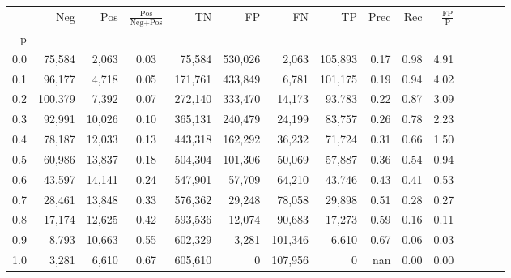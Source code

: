 \begin{tabular}{rrrcrrrrrrrrrrr}
\toprule
{} &      Neg &     Pos & $\frac{\text{Pos}}{\text{Neg}+\text{Pos}}$ &       TN &       FP &       FN &       TP &  Prec &   Rec & $\frac{\text{FP}}{\text{P}}$ \\
p   &          &         &                                            &          &          &          &          &       &       &                              \\
\midrule
0.0 &   75,584 &   2,063 &                                       0.03 &   75,584 &  530,026 &    2,063 &  105,893 &  0.17 &  0.98 &                         4.91 \\
0.1 &   96,177 &   4,718 &                                       0.05 &  171,761 &  433,849 &    6,781 &  101,175 &  0.19 &  0.94 &                         4.02 \\
0.2 &  100,379 &   7,392 &                                       0.07 &  272,140 &  333,470 &   14,173 &   93,783 &  0.22 &  0.87 &                         3.09 \\
0.3 &   92,991 &  10,026 &                                       0.10 &  365,131 &  240,479 &   24,199 &   83,757 &  0.26 &  0.78 &                         2.23 \\
0.4 &   78,187 &  12,033 &                                       0.13 &  443,318 &  162,292 &   36,232 &   71,724 &  0.31 &  0.66 &                         1.50 \\
0.5 &   60,986 &  13,837 &                                       0.18 &  504,304 &  101,306 &   50,069 &   57,887 &  0.36 &  0.54 &                         0.94 \\
0.6 &   43,597 &  14,141 &                                       0.24 &  547,901 &   57,709 &   64,210 &   43,746 &  0.43 &  0.41 &                         0.53 \\
0.7 &   28,461 &  13,848 &                                       0.33 &  576,362 &   29,248 &   78,058 &   29,898 &  0.51 &  0.28 &                         0.27 \\
0.8 &   17,174 &  12,625 &                                       0.42 &  593,536 &   12,074 &   90,683 &   17,273 &  0.59 &  0.16 &                         0.11 \\
0.9 &    8,793 &  10,663 &                                       0.55 &  602,329 &    3,281 &  101,346 &    6,610 &  0.67 &  0.06 &                         0.03 \\
1.0 &    3,281 &   6,610 &                                       0.67 &  605,610 &        0 &  107,956 &        0 &   nan &  0.00 &                         0.00 \\
\bottomrule
\end{tabular}
